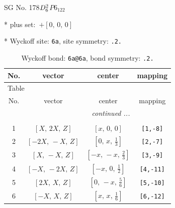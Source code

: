 \documentclass[fleqn,8pt]{jsarticle}
\begin{document}
\setcounter{MaxMatrixCols}{32}

\renewcommand{\tablename}{Table~}
\renewcommand{\figurename}{Figure~}
\begin{center}
\LARGE
SG No. 178\quad$D_{\rm 6}^{2}$\quad$P6_122$\quad[ hexagonal ]
\end{center}

* plus set:\,\,\,$+\left[ 0,\, 0,\, 0 \right]$


* Wyckoff site: {\tt 6a}, site symmetry: {\tt .2.}
\renewcommand{\arraystretch}{1.2}
\begin{longtable}{cccc}
\caption{Wyckoff bond: {\tt 6a@6a}, bond symmetry: {\tt .2.}}
 \\
 \hline \hline
No. & vector & center & mapping \\ \hline \endfirsthead

\multicolumn{3}{l}{\tablename\ \thetable{}} \\
 \hline \hline
No. & vector & center & mapping \\ \hline \endhead

 \hline \hline
\multicolumn{3}{r}{\footnotesize\it continued ...} \\ \endfoot

 \hline \hline
\multicolumn{3}{r}{} \\ \endlastfoot

1 & $\left[ X,\, 2 X,\, Z \right]$ & $\left[ x,\, 0,\, 0 \right]$ & {\tt [1,-8]} \\ \hline
2 & $\left[ - 2 X,\, - X,\, Z \right]$ & $\left[ 0,\, x,\, \frac{1}{3} \right]$ & {\tt [2,-7]} \\ \hline
3 & $\left[ X,\, - X,\, Z \right]$ & $\left[ - x,\, - x,\, \frac{2}{3} \right]$ & {\tt [3,-9]} \\ \hline
4 & $\left[ - X,\, - 2 X,\, Z \right]$ & $\left[ - x,\, 0,\, \frac{1}{2} \right]$ & {\tt [4,-11]} \\ \hline
5 & $\left[ 2 X,\, X,\, Z \right]$ & $\left[ 0,\, - x,\, \frac{5}{6} \right]$ & {\tt [5,-10]} \\ \hline
6 & $\left[ - X,\, X,\, Z \right]$ & $\left[ x,\, x,\, \frac{1}{6} \right]$ & {\tt [6,-12]} \\
\end{longtable}
\renewcommand{\arraystretch}{1.2}
\end{document}
